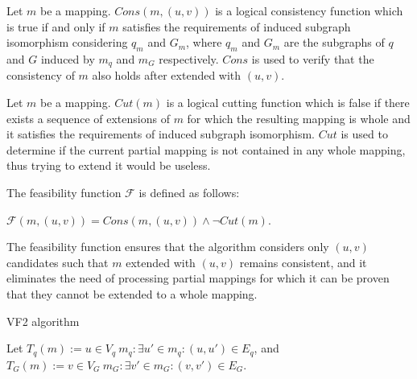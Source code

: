 \begin{definition}
    Let $m$ be a mapping. $Cons(m, (u, v))$ is a logical consistency function which is true if and only if $m$
    satisfies the requirements of induced subgraph isomorphism considering $q_m$ and $G_m$, where
    $q_m$ and $G_m$ are the subgraphs of $q$ and $G$ induced by $m_q$ and $m_G$
    respectively. $Cons$ is used to verify that the consistency of $m$ also holds after extended with $(u, v)$.
\end{definition}

\begin{definition}
    Let $m$ be a mapping. $Cut(m)$ is a logical cutting function which is false if there exists a 
    sequence of extensions of $m$ for which the resulting mapping is whole and it satisfies the
    requirements of induced subgraph isomorphism. $Cut$ is used to determine if the current partial 
    mapping is not contained in any whole mapping, thus trying to extend it would be useless.
\end{definition}

\begin{definition}
    The feasibility function $\mathcal{F}$ is defined as follows: 
    
    $\mathcal{F}(m, (u, v)) = Cons(m, (u, v)) \land \neg Cut(m)$.
\end{definition}

The feasibility function ensures that the algorithm considers only $(u, v)$ candidates such that 
$m$ extended with $(u, v)$ remains consistent, and it eliminates the need of processing partial
mappings for which it can be proven that they cannot be extended to a whole mapping.

\begin{algorithm}[h]
    \SetAlgoLined\DontPrintSemicolon
    \caption{VF2 algorithm}
\end{algorithm}

Let $T_q(m) := {u \in V_q \ m_q: \exists u' \in m_q: (u, u') \in E_q}$, and \\
$T_G(m) := {v \in V_G \ m_G: \exists v' \in m_G: (v, v') \in E_G}$.


